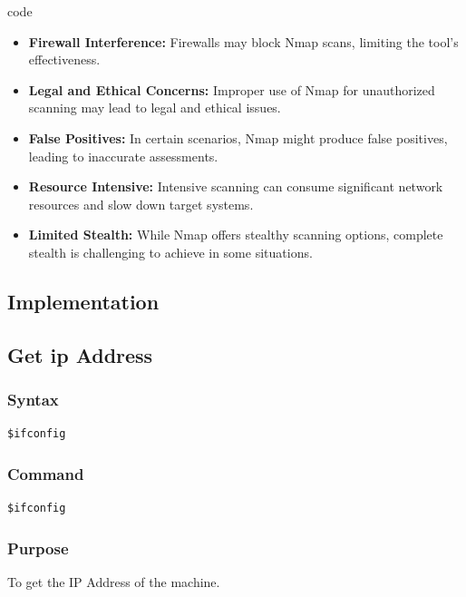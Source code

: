 code \documentclass[11pt]{article}
\begin{document}
\begin{itemize}
    \item \textbf{Firewall Interference:} Firewalls may block Nmap scans, limiting the tool's effectiveness.
    \item \textbf{Legal and Ethical Concerns:} Improper use of Nmap for unauthorized scanning may lead to legal and ethical issues.
    \item \textbf{False Positives:} In certain scenarios, Nmap might produce false positives, leading to inaccurate assessments.
    \item \textbf{Resource Intensive:} Intensive scanning can consume significant network resources and slow down target systems.
    \item \textbf{Limited Stealth:} While Nmap offers stealthy scanning options, complete stealth is challenging to achieve in some situations.
\end{itemize}

\subsection{Implementation}

\subsection{Get ip Address}

\subsubsection*{Syntax}
\begin{verbatim}
$ifconfig
\end{verbatim}

\subsubsection*{Command}
\begin{verbatim}
$ifconfig
\end{verbatim}

\subsubsection*{Purpose}
To get the IP Address of the machine.
\end{document}
